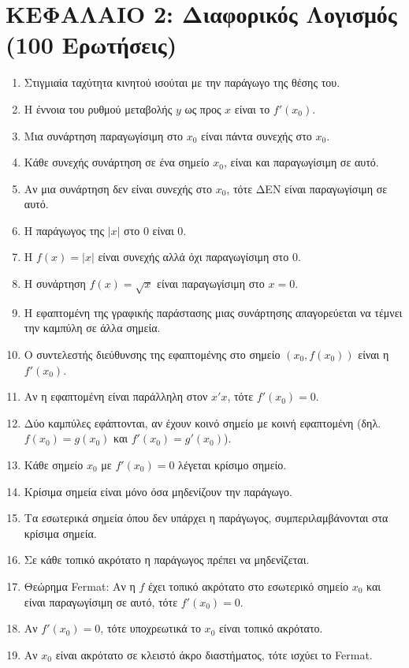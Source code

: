 \documentclass[11pt,a4paper]{article}
\newcommand{\eng}[1]{\selectlanguage{english}#1\selectlanguage{greek}}
\begin{document}
\section*{ΚΕΦΑΛΑΙΟ 2: Διαφορικός Λογισμός (100 Ερωτήσεις)}
\begin{enumerate}[label=\textbf{2.\arabic*.}]
    \item Στιγμιαία ταχύτητα κινητού ισούται με την παράγωγο της θέσης του.
    \item Η έννοια του ρυθμού μεταβολής $y$ ως προς $x$ είναι το $f'(x_0)$.
    \item Μια συνάρτηση παραγωγίσιμη στο $x_0$ είναι πάντα συνεχής στο $x_0$.
    \item Κάθε συνεχής συνάρτηση σε ένα σημείο $x_0$, είναι και παραγωγίσιμη σε αυτό.
    \item Αν μια συνάρτηση δεν είναι συνεχής στο $x_0$, τότε ΔΕΝ είναι παραγωγίσιμη σε αυτό.
    \item Η παράγωγος της $|x|$ στο 0 είναι 0.
    \item H $f(x)=|x|$ είναι συνεχής αλλά όχι παραγωγίσιμη στο 0.
    \item Η συνάρτηση $f(x) = \sqrt{x}$ είναι παραγωγίσιμη στο $x=0$.
    \item Η εφαπτομένη της γραφικής παράστασης μιας συνάρτησης απαγορεύεται να τέμνει την καμπύλη σε άλλα σημεία.
    \item Ο συντελεστής διεύθυνσης της εφαπτομένης στο σημείο $(x_0, f(x_0))$ είναι η $f'(x_0)$.
    \item Αν η εφαπτομένη είναι παράλληλη στον $x'x$, τότε $f'(x_0) = 0$.
    \item Δύο καμπύλες εφάπτονται, αν έχουν κοινό σημείο με κοινή εφαπτομένη (δηλ. $f(x_0)=g(x_0)$ και $f'(x_0)=g'(x_0)$).
    \item Κάθε σημείο $x_0$ με $f'(x_0)=0$ λέγεται κρίσιμο σημείο.
    \item Κρίσιμα σημεία είναι μόνο όσα μηδενίζουν την παράγωγο.
    \item Τα εσωτερικά σημεία όπου δεν υπάρχει η παράγωγος, συμπεριλαμβάνονται στα κρίσιμα σημεία.
    \item Σε κάθε τοπικό ακρότατο η παράγωγος πρέπει να μηδενίζεται.
    \item Θεώρημα \eng{Fermat}: Αν η $f$ έχει τοπικό ακρότατο στο εσωτερικό σημείο $x_0$ και είναι παραγωγίσιμη σε αυτό, τότε $f'(x_0) = 0$.
    \item Αν $f'(x_0) = 0$, τότε υποχρεωτικά το $x_0$ είναι τοπικό ακρότατο.
    \item Αν $x_0$ είναι ακρότατο σε κλειστό άκρο διαστήματος, τότε ισχύει το \eng{Fermat}.

\end{enumerate}
\end{document}
